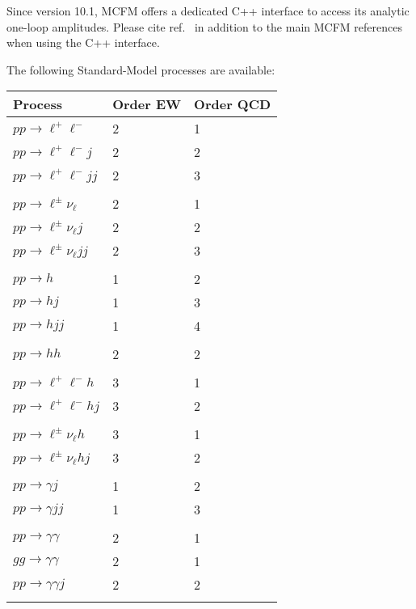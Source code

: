 \newpage

\hypertarget{c-interface}{%
\label{c-interface}}

Since version 10.1, MCFM offers a dedicated C++ interface to access its
analytic one-loop amplitudes. Please cite ref.~\cite{Campbell:2021vlt} in
addition to the main MCFM references when using the C++ interface.

\hypertarget{available-processes}{%
\label{available-processes}}

The following Standard-Model processes are available:

\begin{longtable}[]{@{}lll@{}}
\hline
Process & Order EW & Order QCD \\
\hline
\endhead
\(pp\to \ell^+\ell^-\) & 2 & 1 \\
\(pp\to \ell^+\ell^- j\) & 2 & 2 \\
\(pp\to \ell^+\ell^- j j\) & 2 & 3 \\
& & \\
\(pp\to \ell^\pm\nu_\ell\) & 2 & 1 \\
\(pp\to \ell^\pm\nu_\ell j\) & 2 & 2 \\
\(pp\to \ell^\pm\nu_\ell j j\) & 2 & 3 \\
& & \\
\(pp\to h\) & 1 & 2 \\
\(pp\to h j\) & 1 & 3 \\
\(pp\to h j j\) & 1 & 4 \\
& & \\
\(pp\to h h\) & 2 & 2 \\
& & \\
\(pp\to \ell^+\ell^- h\) & 3 & 1 \\
\(pp\to \ell^+\ell^- h j\) & 3 & 2 \\
& & \\
\(pp\to \ell^\pm\nu_\ell h\) & 3 & 1 \\
\(pp\to \ell^\pm\nu_\ell h j\) & 3 & 2 \\
& & \\
\(pp\to \gamma j\) & 1 & 2 \\
\(pp\to \gamma j j\) & 1 & 3 \\
& & \\
\(pp\to \gamma \gamma\) & 2 & 1 \\
\(gg\to \gamma \gamma\) & 2 & 1 \\
\(pp\to \gamma \gamma j\) & 2 & 2 \\
& & \\

\end{longtable}
